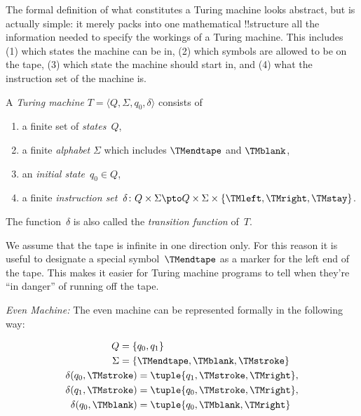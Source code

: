 \documentclass[../../../include/open-logic-section]{subfiles}
\begin{document}

\begin{explain}
The formal definition of what constitutes a Turing machine looks
abstract, but is actually simple: it merely packs into one
mathematical !!{structure} all the information needed to specify the
workings of a Turing machine. This includes (1) which states the
machine can be in, (2) which symbols are allowed to be on the tape, (3)
which state the machine should start in, and (4) what the instruction
set of the machine is.
\end{explain}

\begin{defn}
A \emph{Turing machine} $T = \langle Q, \Sigma, q_0, \delta\rangle$ consists of
\begin{enumerate}
\item a finite set of \emph{states}~$Q$,
\item a finite \emph{alphabet} $\Sigma$ which includes $\TMendtape$ and
  $\TMblank$,
\item an \emph{initial state}~$q_0 \in Q$,
\item a finite \emph{instruction set}~$\delta\colon Q \times \Sigma
  \pto Q \times \Sigma \times \{\TMleft, \TMright, \TMstay\}$.
\end{enumerate}
The function~$\delta$ is also called the \emph{transition function} of~$T$.
\end{defn}

\begin{explain}
We assume that the tape is infinite in one direction only. For this
reason it is useful to designate a special symbol~$\TMendtape$ as
a marker for the left end of the tape. This makes it easier for
Turing machine programs to tell when they're ``in danger'' of running
off the tape. 
\end{explain}

\begin{ex}
\emph{Even Machine:} The even machine can be represented formally
in the following way:

\begin{align*}
Q = \{ & q_0, q_1 \} \\
\Sigma = \{ & \TMendtape, \TMblank, \TMstroke \} \\
\delta(q_0, \TMstroke) & = \tuple{q_1, \TMstroke, \TMright},\\
\delta(q_1, \TMstroke) & = \tuple{q_0, \TMstroke, \TMright},\\
\delta(q_0, \TMblank)  & = \tuple{q_0, \TMblank, \TMright}
\end{align*}
\end{ex}
\end{document}
